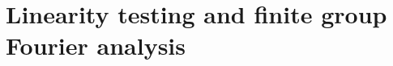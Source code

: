 \chapter{Linearity testing and finite group Fourier analysis}
\label{chapter:linearity-testing}





